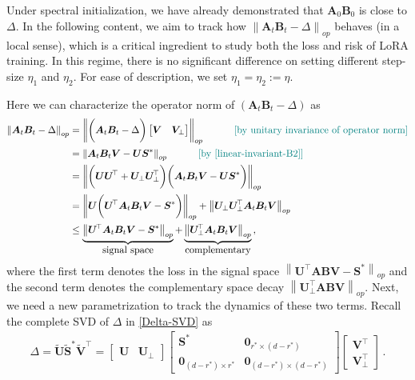 Under spectral initialization, we have already demonstrated that $\bm A_0 \bm B_0$ is close to $\Delta$. In the following content, we aim to track how $\left\|\bm A_t \bm B_t - \Delta\right\|_{op}$ behaves (in a local sense), which is a critical ingredient to study both the loss and risk of LoRA training. In this regime, there is no significant difference on setting different step-size $\eta_1$ and $\eta_2$. For ease of description, we set $\eta_1=\eta_2 := \eta$.

Here we can characterize the operator norm of $\left(\bm A_t \bm B_t - \Delta\right)$ as
\begin{align}
    \left\|\bm A_t \bm B_t - \Delta\right\|_{op} & = \left\|\bigg(\bm A_t \bm B_t - \Delta\bigg)\begin{bmatrix}
        \bm V & \bm V_\perp
    \end{bmatrix}\right\|_{op} \quad \tag*{\color{teal}[by unitary invariance of operator norm]}\nonumber\\
    & = \left\|\bm A_t \bm B_t\bm V - \bm U\bm S^*\right\|_{op} \quad \tag*{\color{teal}[by \cref{linear-invariant-B2}]}\nonumber\\
    & = \left\|\bigg(\bm U \bm U^{\!\top}+\bm U_{\perp} \bm U^{\!\top}_\perp\bigg)\bigg(\bm A_t \bm B_t\bm V - \bm U\bm S^*\bigg)\right\|_{op}\nonumber\\
    & = \left\|\bm U \bigg(\bm U^{\!\top}\bm A_t \bm B_t\bm V - \bm S^*\bigg)\right\|_{op}+\left\|\bm U_{\perp} \bm U^{\!\top}_\perp\bm A_t \bm B_t\bm V\right\|_{op}\nonumber\\
    & \leq  \underbrace{\left\|\bm U^{\!\top}\bm A_t \bm B_t\bm V - \bm S^*\right\|_{op}}_{\mbox{signal space}}+ \underbrace{\left\|\bm U^{\!\top}_\perp\bm A_t \bm B_t\bm V\right\|_{op}}_{\mbox{complementary}}\,,\label{deco}
\end{align}
where the first term denotes the loss in the signal space $\left\|\bm U^{\!\top}\bm A \bm B\bm V - \bm S^*\right\|_{op}$ and the second term denotes the complementary space decay $\left\|\bm U^{\!\top}_\perp\bm A \bm B\bm V\right\|_{op}$. Next, we need a new parametrization to track the dynamics of these two terms. Recall the complete SVD of $\Delta$ in \cref{Delta-SVD} as
\begin{align*}
\Delta=\widetilde{\bm U} \widetilde{\bm S}^* \widetilde{\bm V}^{\!\top}=
    \begin{bmatrix}
        \bm U & \bm U_\perp
    \end{bmatrix}\begin{bmatrix}
       \bm S^* & \bm 0_{r^*\times (d-r^*)}\\
        \bm 0_{(d-r^*)\times r^*} & \bm 0_{(d-r^*)\times (d-r^*)}
    \end{bmatrix}\begin{bmatrix}
        \bm V^{\!\top} \\ \bm V_\perp^{\!\top}
    \end{bmatrix}\,.
\end{align*}
